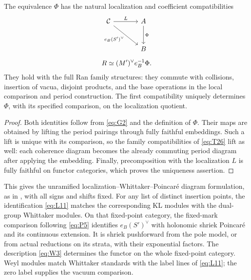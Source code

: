 \begin{theorem}\label{equivalence:compatibility}
The equivalence \(\Phi\) has the natural localization and coefficient
compatibilities
\begin{equation}\label{eq:G5}
 \begin{gathered}
 \begin{tikzcd}[ampersand replacement=\&,column sep=large,row sep=large]
 \mathcal C \arrow[r,"L"] \arrow[dr,"e_B(S')^\vee"']
   \& A \arrow[d,"\Phi"] \\
   \& B
 \end{tikzcd}
 \\[1ex]
 R\simeq(M')^\vee e_B^{-1}\Phi.
 \end{gathered}
\end{equation}
They hold with the full Ran family structures: they commute with
collisions, insertion of vacua, disjoint products, and the base operations
in the local comparison and period construction.  The first
compatibility uniquely determines \(\Phi\), with its specified
comparison, on the localization quotient.
\end{theorem}

\begin{proof}
Both identities follow from \eqref{eq:G2} and the definition of
\(\Phi\).  Their maps are obtained by lifting the period pairings
through fully faithful embeddings.  Such a lift is unique with its
comparison, so the family compatibilities of \eqref{eq:T26} lift as
well: each coherence diagram becomes the already commuting period
diagram after applying the embedding.  Finally, precomposition with
the localization \(L\) is fully faithful on functor categories, which
proves the uniqueness assertion.
\end{proof}

This gives the unramified localization--Whittaker--Poincar\'e diagram
formulation, as in \cite[Section~4]{GaitsgoryQGL}, with all signs and
shifts fixed.  For any list of distinct insertion points, the
identification \eqref{eq:L11} matches the corresponding KL modules
with the dual-group Whittaker modules.  On that fixed-point category,
the fixed-mark comparison following \eqref{eq:P5} identifies
\(e_B(S')^\vee\) with holonomic shriek Poincar\'e and its continuous
extension.  It is shriek pushforward from the pole model, or from
actual reductions on its strata, with their exponential factors.
The description \eqref{eq:W3} determines the functor on the whole
fixed-point category.  Weyl modules match Whittaker standards with the
label lines of \eqref{eq:L11}; the zero label supplies the vacuum
comparison.

